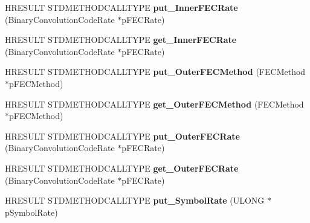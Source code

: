 \begin{DoxyCompactItemize}
\item 
\mbox{\label{class_c_b_d_a_digital_demodulator_ad0e80c012a18e7d3e61d081d4a74ff2e}} 
H\+R\+E\+S\+U\+LT S\+T\+D\+M\+E\+T\+H\+O\+D\+C\+A\+L\+L\+T\+Y\+PE {\bfseries put\+\_\+\+Inner\+F\+E\+C\+Rate} (Binary\+Convolution\+Code\+Rate $\ast$p\+F\+E\+C\+Rate)
\item 
\mbox{\label{class_c_b_d_a_digital_demodulator_aa0e5cc1270d3f8101ed62c2a60b273ec}} 
H\+R\+E\+S\+U\+LT S\+T\+D\+M\+E\+T\+H\+O\+D\+C\+A\+L\+L\+T\+Y\+PE {\bfseries get\+\_\+\+Inner\+F\+E\+C\+Rate} (Binary\+Convolution\+Code\+Rate $\ast$p\+F\+E\+C\+Rate)
\item 
\mbox{\label{class_c_b_d_a_digital_demodulator_a76e9d855028c0f27697e104a7ca46de5}} 
H\+R\+E\+S\+U\+LT S\+T\+D\+M\+E\+T\+H\+O\+D\+C\+A\+L\+L\+T\+Y\+PE {\bfseries put\+\_\+\+Outer\+F\+E\+C\+Method} (F\+E\+C\+Method $\ast$p\+F\+E\+C\+Method)
\item 
\mbox{\label{class_c_b_d_a_digital_demodulator_a126532fbf8e7a045bc757e9a3c8e34d5}} 
H\+R\+E\+S\+U\+LT S\+T\+D\+M\+E\+T\+H\+O\+D\+C\+A\+L\+L\+T\+Y\+PE {\bfseries get\+\_\+\+Outer\+F\+E\+C\+Method} (F\+E\+C\+Method $\ast$p\+F\+E\+C\+Method)
\item 
\mbox{\label{class_c_b_d_a_digital_demodulator_abd023fc970d749e3cade4e4d3ebcc9c9}} 
H\+R\+E\+S\+U\+LT S\+T\+D\+M\+E\+T\+H\+O\+D\+C\+A\+L\+L\+T\+Y\+PE {\bfseries put\+\_\+\+Outer\+F\+E\+C\+Rate} (Binary\+Convolution\+Code\+Rate $\ast$p\+F\+E\+C\+Rate)
\item 
\mbox{\label{class_c_b_d_a_digital_demodulator_aee37b017e4aa97db9861821aef365027}} 
H\+R\+E\+S\+U\+LT S\+T\+D\+M\+E\+T\+H\+O\+D\+C\+A\+L\+L\+T\+Y\+PE {\bfseries get\+\_\+\+Outer\+F\+E\+C\+Rate} (Binary\+Convolution\+Code\+Rate $\ast$p\+F\+E\+C\+Rate)
\item 
\mbox{\label{class_c_b_d_a_digital_demodulator_a210c7159278833b3ab056f7b069dbe38}} 
H\+R\+E\+S\+U\+LT S\+T\+D\+M\+E\+T\+H\+O\+D\+C\+A\+L\+L\+T\+Y\+PE {\bfseries put\+\_\+\+Symbol\+Rate} (U\+L\+O\+NG $\ast$p\+Symbol\+Rate)

\end{DoxyCompactItemize}
